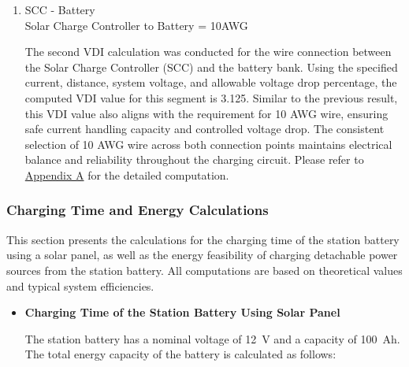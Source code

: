 {\begin{itemize}
\begin{enumerate}[label=\alph*.]
 		
 		The first VDI calculation was performed for the wire connection between the solar panel and the Solar Charge Controller (SCC). Given the operational current and wire distance in this segment, the computed VDI value resulted in 3.52. Based on standard VDI wire reference charts, a value of 3.52 corresponds to the use of 10 AWG wire, which provides sufficient conductivity and prevents excessive voltage reduction over the cable length. This ensures that power harvested from the solar panel is efficiently delivered to the SCC with minimal losses. Please refer to \hyperref[appendix:A]{Appendix A} for the detailed computation.
 		
 		\item SCC - Battery\\
 		Solar Charge Controller to Battery = 10AWG
 		
 		
 		The second VDI calculation was conducted for the wire connection between the Solar Charge Controller (SCC) and the battery bank. Using the specified current, distance, system voltage, and allowable voltage drop percentage, the computed VDI value for this segment is 3.125. Similar to the previous result, this VDI value also aligns with the requirement for 10 AWG wire, ensuring safe current handling capacity and controlled voltage drop. The consistent selection of 10 AWG wire across both connection points maintains electrical balance and reliability throughout the charging circuit. Please refer to \hyperref[appendix:A]{Appendix A} for the detailed computation.
 		
 	\end{enumerate}
 \end{itemize}
 
 \subsubsection{Charging Time and Energy Calculations}
 
 This section presents the calculations for the charging time of the station battery using a solar panel, as well as the energy feasibility of charging detachable power sources from the station battery. All computations are based on theoretical values and typical system efficiencies.
 
  \begin{itemize}
 	\item\textbf{Charging Time of the Station Battery Using Solar Panel} 
 
 The station battery has a nominal voltage of 12~V and a capacity of 100~Ah. The total energy capacity of the battery is calculated as follows:
 

\end{itemize}}
